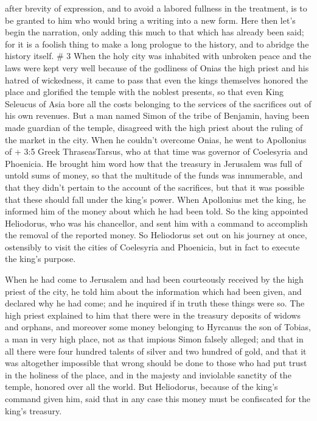 after brevity of expression, and to avoid a labored fullness in the
treatment, is to be granted to him who would bring a writing into a new
form.  Here then let's begin the narration, only adding
this much to that which has already been said; for it is a foolish thing
to make a long prologue to the history, and to abridge the history
itself. \# 3  When the holy city was inhabited with unbroken
peace and the laws were kept very well because of the godliness of Onias
the high priest and his hatred of wickedness,  it came to
pass that even the kings themselves honored the place and glorified the
temple with the noblest presents,  so that even King
Seleucus of Asia bore all the costs belonging to the services of the
sacrifices out of his own revenues.  But a man named Simon
of the tribe of Benjamin, having been made guardian of the temple,
disagreed with the high priest about the ruling of the market in the
city.  When he couldn't overcome Onias, he went to
Apollonius of + 3:5 Greek ThraseasTarsus, who at that time was governor
of Coelesyria and Phoenicia.  He brought him word how that
the treasury in Jerusalem was full of untold sums of money, so that the
multitude of the funds was innumerable, and that they didn't pertain to
the account of the sacrifices, but that it was possible that these
should fall under the king's power.  When Apollonius met the
king, he informed him of the money about which he had been told. So the
king appointed Heliodorus, who was his chancellor, and sent him with a
command to accomplish the removal of the reported money.  So
Heliodorus set out on his journey at once, ostensibly to visit the
cities of Coelesyria and Phoenicia, but in fact to execute the king's
purpose.

 When he had come to Jerusalem and had been courteously
received by the high priest of the city, he told him about the
information which had been given, and declared why he had come; and he
inquired if in truth these things were so.  The high priest
explained to him that there were in the treasury deposits of widows and
orphans,  and moreover some money belonging to Hyrcanus the
son of Tobias, a man in very high place, not as that impious Simon
falsely alleged; and that in all there were four hundred talents of
silver and two hundred of gold,  and that it was altogether
impossible that wrong should be done to those who had put trust in the
holiness of the place, and in the majesty and inviolable sanctity of the
temple, honored over all the world.  But Heliodorus,
because of the king's command given him, said that in any case this
money must be confiscated for the king's treasury.

